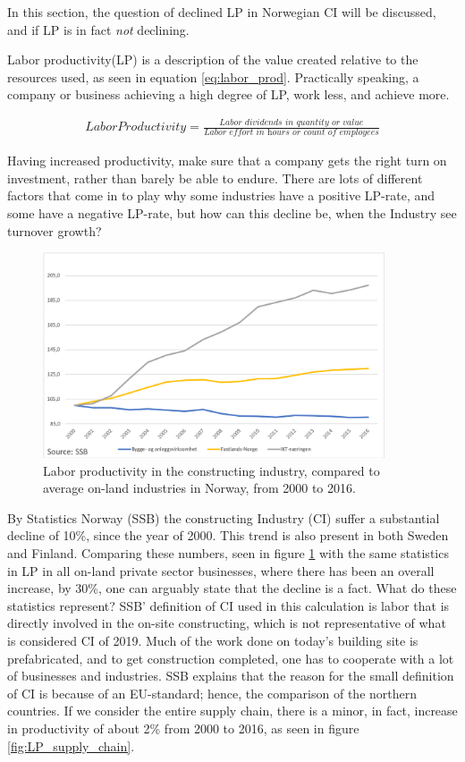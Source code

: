 In this section, the question of declined LP in Norwegian CI will be discussed, and if LP is in fact \textit{not} declining.

Labor productivity(LP) is a description of the value created relative to the resources used, as seen in equation \ref{eq:labor_prod}. Practically speaking, a company or business achieving a high degree of LP, work less, and achieve more. 

\begin{eqnarray}\label{eq:labor_prod}
Labor Productivity = \frac{\textit{Labor dividends in quantity or value}}{\textit{Labor effort in hours or count of employees}} 
\end{eqnarray}

Having increased productivity, make sure that a company gets the right turn on investment, rather than barely be able to endure. There are lots of different factors that come in to play why some industries have a positive LP-rate, and some have a negative LP-rate, but how can this decline be, when the Industry see turnover growth?

\begin{figure}
    \centering
    \includegraphics[width=0.9\textwidth]{fig/ba_on-land_ICT.png}
    \caption{Labor productivity in the constructing industry, compared to average on-land industries in Norway, from 2000 to 2016.}
    \label{fig:productivity-comparing}
\end{figure}

By Statistics Norway (SSB) the constructing Industry (CI) suffer a substantial decline of 10\%, since the year of 2000. This trend is also present in both Sweden and Finland. Comparing these numbers, seen in figure \ref{fig:productivity-comparing} with the same statistics in LP in all on-land private sector businesses, where there has been an overall increase, by 30\%, one can arguably state that the decline is a fact. What do these statistics represent? SSB' definition of CI used in this calculation is labor that is directly involved in the on-site constructing, which is not representative of what is considered CI of 2019. Much of the work done on today's building site is prefabricated, and to get construction completed, one has to cooperate with a lot of businesses and industries. SSB explains that the reason for the small definition of CI is because of an EU-standard; hence, the comparison of the northern countries. If we consider the entire supply chain, there is a minor, in fact, increase in productivity of about 2\% from 2000 to 2016, as seen in figure \ref{fig:LP_supply_chain}.

